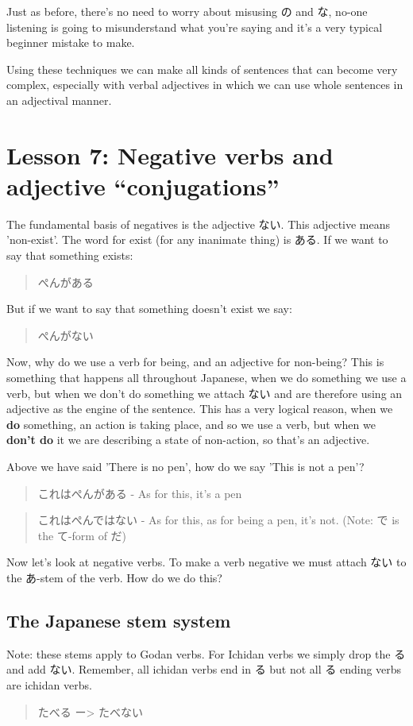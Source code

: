 \documentclass[11pt]{article}
\begin{document}
Just as before, there's no need to worry about misusing の and な, no-one listening is going to misunderstand what you're saying and it's a very typical beginner mistake to make.

Using these techniques we can make all kinds of sentences that can become very complex, especially with verbal adjectives in which we can use whole sentences in an adjectival manner.
\section{Lesson 7: Negative verbs and adjective ``conjugations''}
\label{sec:orga91d892}
The fundamental basis of negatives is the adjective ない. This adjective means 'non-exist'. The word for exist (for any inanimate thing) is ある. If we want to say that something exists:
\begin{quote}
ぺんがある
\end{quote}
But if we want to say that something doesn't exist we say:
\begin{quote}
ぺんがない
\end{quote}
Now, why do we use a verb for being, and an adjective for non-being? This is something that happens all throughout Japanese, when we do something we use a verb, but when we don't do something we attach ない and are therefore using an adjective as the engine of the sentence. This has a very logical reason, when we \textbf{do} something, an action is taking place, and so we use a verb, but when we \textbf{don't do} it we are describing a state of non-action, so that's an adjective.

Above we have said 'There is no pen', how do we say 'This is not a pen'?
\begin{quote}
これはぺんがある - As for this, it's a pen
\end{quote}
\begin{quote}
これはぺんではない - As for this, as for being a pen, it's not. (Note: で is the て-form of だ)
\end{quote}

Now let's look at negative verbs. To make a verb negative we must attach ない to the あ-stem of the verb. How do we do this?

\subsection{The Japanese stem system}
\label{sec:org780a039}
Note: these stems apply to Godan verbs. For Ichidan verbs we simply drop the る and add ない. Remember, all ichidan verbs end in る but not all る ending verbs are ichidan verbs.
\begin{quote}
たべる ー> たべない
\end{quote}
\end{document}
